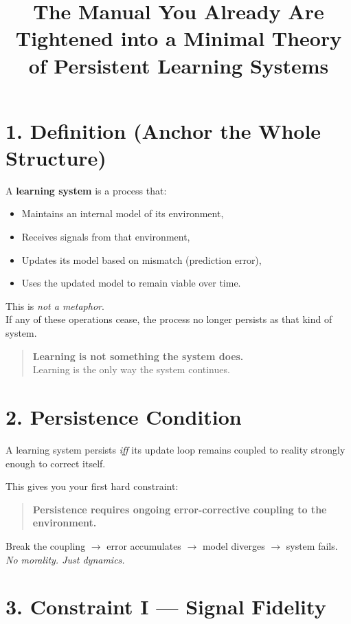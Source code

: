 \documentclass[11pt, a4paper]{article}
\title{\textbf{The Manual You Already Are} \\ \large Tightened into a Minimal Theory of Persistent Learning Systems}
\author{}
\date{}
\begin{document}
\maketitle

\section*{1. Definition (Anchor the Whole Structure)}

A \textbf{learning system} is a process that:
\begin{itemize}
    \item Maintains an internal model of its environment,
    \item Receives signals from that environment,
    \item Updates its model based on mismatch (prediction error),
    \item Uses the updated model to remain viable over time.
\end{itemize}

This is \textit{not a metaphor}. \\
If any of these operations cease, the process no longer persists as that kind of system.

\begin{quote}
\textbf{Learning is not something the system does.} \\
Learning is the only way the system continues.
\end{quote}

\section*{2. Persistence Condition}

A learning system persists \textit{iff} its update loop remains coupled to reality strongly enough to correct itself.

This gives you your first hard constraint:
\begin{quote}
    \textbf{Persistence requires ongoing error-corrective coupling to the environment.}
\end{quote}

Break the coupling $\rightarrow$ error accumulates $\rightarrow$ model diverges $\rightarrow$ system fails. \\
\textit{No morality. Just dynamics.}

\section*{3. Constraint I — Signal Fidelity}
\end{document}
